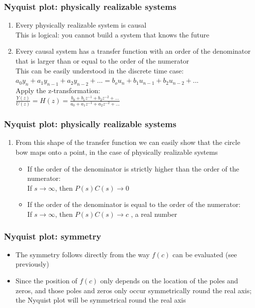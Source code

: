 \newcommand{\asuivre}{\setcounter{sauvegardeenumi}{\theenumi}}
\newcommand{\suite}{\setcounter{enumi}{\thesauvegardeenumi}}


\begin{frame}
\frametitle{Nyquist plot: physically realizable systems}
\begin{enumerate}
\item Every physically realizable system is causal
\\This is logical: you cannot build a system that knows the future
\item Every causal system has a transfer function with an order of the denominator that is larger than or equal to the order of the numerator
\\This can be easily understood in the discrete time case:
\\ $ a_0y_n + a_1y_{n-1} + a_2y_{n-2} + ... = b_ou_n + b_1u_{n-1} + b_2u_{n-2} + ...$
\\ Apply the z-transformation: 
\\$\frac{Y(z)}{U(z)}= H(z)= \frac{b_0+b_1z^{-1}+b_2z^{-2}+...}{a_0+a_1z^{-1}+a_2z^{-2}+...}$
\asuivre
\end{enumerate}
\end{frame}

\begin{frame}
\frametitle{Nyquist plot: physically realizable systems}
\begin{enumerate}
\item From this shape of the transfer function we can easily show that the circle bow maps onto a point, in the case of physically realizable systems


\begin{itemize}
\item If the order of the denominator is strictly higher than the order of the numerator:\\ If $s\rightarrow \infty $, then $P(s)C(s) \rightarrow 0$
\item If the order of the denominator is equal to the order of the numerator:\\
If $s\rightarrow \infty $, then $P(s)C(s) \rightarrow c$ , a real number
\end{itemize}
\end{enumerate}
\end{frame}

\begin{frame}
\frametitle{Nyquist plot: symmetry}
\begin{itemize}
\item The symmetry follows directly from the way $f(c)$ can be evaluated (see previously)
\item Since the position of $f(c)$ only depends on the location of the poles and zeros, and those poles and zeros only occur symmetrically round the real axis; the Nyquist plot will be symmetrical round the real axis
\end{itemize}
\end{frame}

